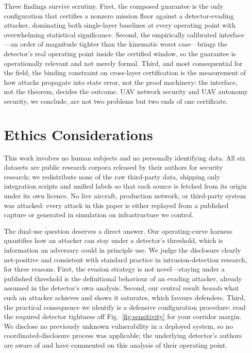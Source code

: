 Three findings survive scrutiny. First, the composed guarantee is the only
configuration that certifies a nonzero mission floor against a detector-evading
attacker, dominating both single-layer baselines at every operating point with
overwhelming statistical significance. Second, the empirically calibrated
interface---an order of magnitude tighter than the kinematic worst case---brings
the detector's real operating point inside the certified window, so the
guarantee is operationally relevant and not merely formal. Third, and most
consequential for the field, the binding constraint on cross-layer certification
is the measurement of how attacks propagate into state error, not the proof
machinery: the interface, not the theorem, decides the outcome. UAV network
security and UAV autonomy security, we conclude, are not two problems but two
ends of one certificate.

\section{Ethics Considerations}
\label{sec:ethics}
This work involves no human subjects and no personally identifying data. All six
datasets are public research corpora released by their authors for security
research; we redistribute none of the raw third-party data, shipping only
integration scripts and unified labels so that each source is fetched from its
origin under its own licence. No live aircraft, production network, or
third-party system was attacked: every attack in this paper is either replayed
from a published capture or generated in simulation on infrastructure we
control.

The dual-use question deserves a direct answer. Our operating-curve harness
quantifies how an attacker can stay under a detector's threshold, which is
information an adversary could in principle use. We judge the disclosure clearly
net-positive and consistent with standard practice in intrusion-detection
research, for three reasons. First, the evasion strategy is not novel---staying
under a published threshold is the definitional behaviour of an evading
attacker, already assumed in the detector's own analysis. Second, our central
result \emph{bounds} what such an attacker achieves and shows it saturates,
which favours defenders. Third, the practical consequence we identify is a
defensive configuration procedure: read the required detector tightness off
Fig.~\ref{fig:sensitivity} for your corridor margin. We disclose no previously
unknown vulnerability in a deployed system, so no coordinated-disclosure process
was applicable; the underlying detector's authors are aware of and have
commented on this analysis of their operating point.

